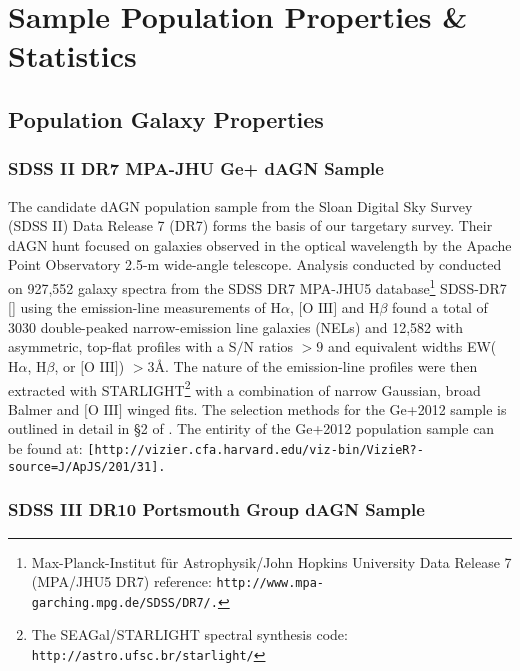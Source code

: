 \section{Sample Population Properties \& Statistics}
\subsection{Population Galaxy Properties}
\subsubsection{SDSS II DR7 MPA-JHU Ge+ dAGN Sample}

The \cite{Ge_Hu_Wang_Bai_Zhang_2012} candidate dAGN population sample from the Sloan Digital Sky Survey (SDSS II) Data Release 7 (DR7) forms the basis of our targetary survey. Their dAGN hunt focused on galaxies observed in the optical wavelength by the Apache Point Observatory 2.5-m wide-angle telescope. Analysis conducted by \cite{Ge_Hu_Wang_Bai_Zhang_2012} conducted on 927,552 galaxy spectra from the SDSS DR7 MPA-JHU5 database\footnote{\tiny{Max-Planck-Institut für Astrophysik/John Hopkins University Data Release 7 (MPA/JHU5 DR7) reference: \tt{http://www.mpa-garching.mpg.de/SDSS/DR7/}.}} SDSS-DR7 [\cite{2009ApJS..182..543A}] using the emission-line measurements of $\text{H}\alpha$, $\text{[O III]}$ and $\text{H}\beta$ found a total of 3030 double-peaked narrow-emission line galaxies (NELs) and 12,582 with asymmetric, top-ﬂat proﬁles with a $\text{S/N}$ ratios ${>}{9}$ and equivalent widths EW($\text{H}\alpha$, $\text{H}\beta$, or $\text{[O III]}$) ${>}{3}$\AA. The nature of the emission-line profiles were then extracted with STARLIGHT\footnote{\tiny{The SEAGal/STARLIGHT spectral synthesis code: \tt{http://astro.ufsc.br/starlight/}}} with a combination of narrow Gaussian, broad Balmer and $\text{[O III]}$ winged fits. The selection methods for the Ge+2012 sample is outlined in detail in §2 of \cite{Ge_Hu_Wang_Bai_Zhang_2012}. The entirity of the Ge+2012 population sample can be found at: \tt[http://vizier.cfa.harvard.edu/viz-bin/VizieR?-source=J/ApJS/201/31].

\subsubsection{SDSS III DR10 Portsmouth Group dAGN Sample}




